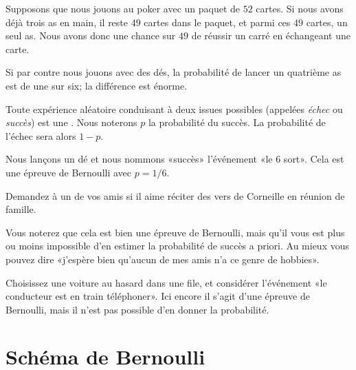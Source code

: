 \begin{example}
    Supposons que nous jouons au poker avec un paquet de \( 52\) cartes. Si nous avons déjà trois as en main, il reste \( 49\) cartes dans le paquet, et parmi ces \( 49\) cartes, un seul as. Nous avons donc une chance sur \( 49\) de réussir un carré en échangeant une carte.

    Si par contre nous jouons avec des dés, la probabilité de lancer un quatrième as est de une sur six; la différence est énorme.
\end{example}


\begin{definition}
    Toute expérience aléatoire conduisant à deux issues possibles (appelées \emph{échec} ou \emph{succès}) est une . Nous noterons \( p\) la probabilité du succès. La probabilité de l'échec sera alors \( 1-p\).
\end{definition}

\begin{example}
    Nous lançons un dé et nous nommons «succès» l'événement «le \( 6\) sort». Cela est une épreuve de Bernoulli avec \( p=1/6\).
\end{example}

\begin{example}
    
    Demandez à un de vos amis si il aime réciter des vers de Corneille en réunion de famille.

    Vous noterez que cela est bien une épreuve de Bernoulli, mais qu'il vous est plus ou moins impossible d'en estimer la probabilité de succès a priori. Au mieux vous pouvez dire «j'espère bien qu'aucun de mes amis n'a ce genre de hobbies».
    
\end{example}

\begin{example}
    Choisissez une voiture au hasard dans une file, et considérer l'événement «le conducteur est en train téléphoner». Ici encore il s'agit d'une épreuve de Bernoulli, mais il n'est pas possible d'en donner la probabilité.
\end{example}

\section{Schéma de Bernoulli}

